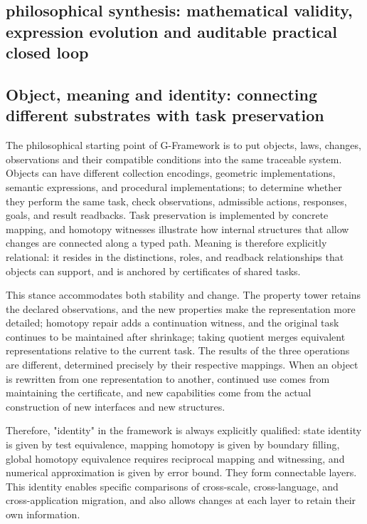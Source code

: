 \documentclass[11pt,a4paper]{article}
\theoremstyle{plain}
\theoremstyle{definition}
\theoremstyle{remark}
\begin{document}
\begin{CJK*}
\section { philosophical synthesis: mathematical validity, expression evolution and auditable practical closed loop }\label{pc:philosophy}


\subsection { Object, meaning and identity: connecting different substrates with task preservation }

The philosophical starting point of G-Framework is to put objects, laws, changes, observations and their compatible conditions into the same traceable system. Objects can have different collection encodings, geometric implementations, semantic expressions, and procedural implementations; to determine whether they perform the same task, check observations, admissible actions, responses, goals, and result readbacks. Task preservation is implemented by concrete mapping, and homotopy witnesses illustrate how internal structures that allow changes are connected along a typed path. Meaning is therefore explicitly relational: it resides in the distinctions, roles, and readback relationships that objects can support, and is anchored by certificates of shared tasks.

This stance accommodates both stability and change. The property tower retains the declared observations, and the new properties make the representation more detailed; homotopy repair adds a continuation witness, and the original task continues to be maintained after shrinkage; taking quotient merges equivalent representations relative to the current task. The results of the three operations are different, determined precisely by their respective mappings. When an object is rewritten from one representation to another, continued use comes from maintaining the certificate, and new capabilities come from the actual construction of new interfaces and new structures.

Therefore, "identity" in the framework is always explicitly qualified: state identity is given by test equivalence, mapping homotopy is given by boundary filling, global homotopy equivalence requires reciprocal mapping and witnessing, and numerical approximation is given by error bound. They form connectable layers. This identity enables specific comparisons of cross-scale, cross-language, and cross-application migration, and also allows changes at each layer to retain their own information.


\end{CJK*}
\end{document}
